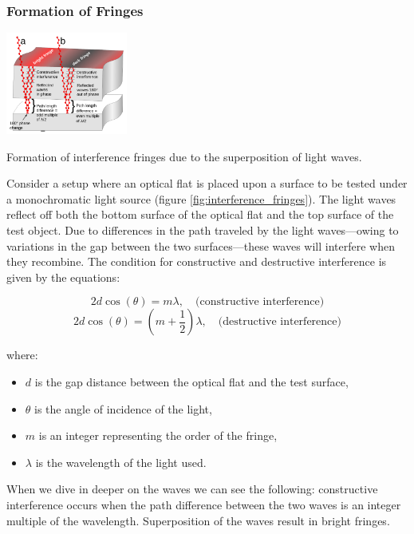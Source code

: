 \documentclass[../main.tex]{subfiles}
\begin{document}
\subsubsection{Formation of Fringes}
\begin{floatingfigure}[r]{0.3\textwidth}%
    \includegraphics[width=0.3\textwidth]{Images/Introduction/Optical_flat_interference}
    \caption{Formation of interference fringes due to the superposition of light waves.\cite{enwiki:1212101911}}
    \label{fig:interference_fringes}
\end{floatingfigure}
Consider a setup where an optical flat is placed upon a surface to be tested under a monochromatic light source (figure \ref{fig:interference_fringes}). The light waves reflect off both the bottom surface of the optical flat and the top surface of the test object. Due to differences in the path traveled by the light waves—owing to variations in the gap between the two surfaces—these waves will interfere when they recombine. The condition for constructive and destructive interference is given by the equations:

\begin{equation}
2d \cos(\theta) = m\lambda, \quad \text{(constructive interference)}
\end{equation}
\begin{equation}
2d \cos(\theta) = (m + \frac{1}{2})\lambda, \quad \text{(destructive interference)}
\end{equation}

where:
\begin{itemize}
    \item \(d\) is the gap distance between the optical flat and the test surface,
    \item \(\theta\) is the angle of incidence of the light,
    \item \(m\) is an integer representing the order of the fringe,
    \item \(\lambda\) is the wavelength of the light used.
\end{itemize}

When we dive in deeper on the waves we can see the following: constructive interference occurs when the path difference between the two waves is an integer multiple of the wavelength. Superposition of the waves result in bright fringes.\cite{enwiki:1212101911}
\end{document}

